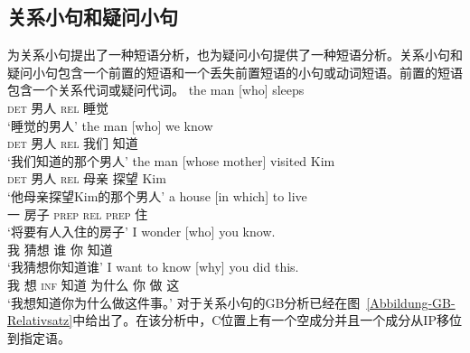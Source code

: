 \begin{exe}
\begin{xlist}[iv.]
\begin{exe}
\begin{xlist}[iv.]
\subsection{关系小句和疑问小句}
\label{Abschnitt-Relativ-Interrogativsaetze}
\mbox{}\citet{Sag97a}为关系小句提出了一种短语分析，\citet{GSag2000a-u}也为疑问小句提供了一种短语分析。关系小句和疑问小句包含一个前置的短语和一个丢失前置短语的小句或动词短语。前置的短语包含一个关系代词或疑问代词。
\eal
\ex
\gll the man [who] sleeps\\
     \textsc{det} 男人 \spacebr\textsc{rel} 睡觉\\
\glt `睡觉的男人' 
\ex
\gll the man [who] we know\\
     \textsc{det} 男人 \spacebr\textsc{rel} 我们 知道\\
\glt `我们知道的那个男人' 
\ex
\gll the man [whose mother] visited Kim\\
     \textsc{det} 男人 \spacebr\textsc{rel} 母亲 探望 Kim\\
\glt `他母亲探望Kim的那个男人' 
\ex
\gll a house [in which] to live\\
     一 房子 \spacebr\textsc{prep} \textsc{rel} \textsc{prep} 住\\
\glt `将要有人入住的房子' 
\zl
\eal
\ex
\gll I wonder [who] you know.\\
     我 猜想   \spacebr{}谁 你 知道\\
\glt `我猜想你知道谁' 
\ex
\gll  I want to         know [why] you did this.\\
      我 想 \textsc{inf} 知道 \spacebr{}为什么 你 做 这\\
\glt `我想知道你为什么做这件事。' 
\zl
对于关系小句的GB分析已经在图~\ref{Abbildung-GB-Relativsatz}中给出了。在该分析中，C位置上有一个空成分并且一个成分从IP移位到指定语。%

\end{xlist}
\end{exe}
\end{xlist}
\end{exe}
